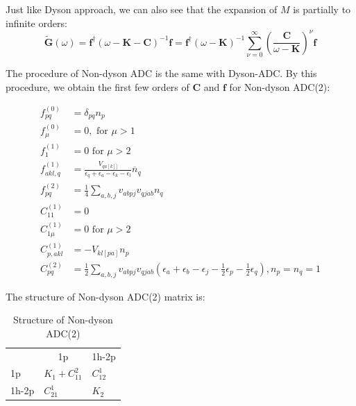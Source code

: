 Just like Dyson approach, we can also see that the expansion of $M$ is partially to infinite orders:
\begin{equation}
	\tilde{\boldsymbol{G}}(\omega)=\boldsymbol{f}^{\dagger}(\omega-\boldsymbol{K}-\boldsymbol{C})^{-1} \boldsymbol{f}=\boldsymbol{f}^{\dagger}(\omega-\boldsymbol{K})^{-1} \sum_{\nu=0}^{\infty}\left(\frac{\boldsymbol{C}}{\omega-\boldsymbol{K}}\right)^{\nu} \boldsymbol{f}
\end{equation}

The procedure of Non-dyson ADC is the same with Dyson-ADC.
By this procedure, we obtain the first few orders of $\boldsymbol{C}$ and $\boldsymbol{f}$ for Non-dyson ADC(2):

\begin{equation}
	\begin{aligned}
		f_{p q}^{(0)}&=\delta_{p q} n_{p}
		\\
		f_{\mu}^{(0)}&=0, \text { for } \mu>1
		\\
		f_{1}^{(1)}&=0 \text { for } \mu>2
		\\
		f_{a k l, q}^{(1)}&=\frac{V_{q a[k] ]}}{\epsilon_{q}+\epsilon_{a}-\epsilon_{k}-\epsilon_{l}} \overline{n}_{q}
		\\
		f_{p q}^{(2)}&=\frac{1}{4} \sum_{a, b, j} v_{a b p j} v_{q j a b} n_{q}
		\\
		C_{11}^{(1)}&=0
		\\
		C_{1 \mu}^{(1)}&=0 \text { for } \mu>2
		\\
		C_{p, a k l}^{(1)}&=-V_{k l[p a]} n_{p}
		\\
		C_{p q}^{(2)}&=\frac{1}{2} \sum_{a, b, j} v_{a b p j} v_{q j a b}\left(\epsilon_{a}+\epsilon_{b}-\epsilon_{j}-\frac{1}{2} \epsilon_{p}-\frac{1}{2} \epsilon_{q}\right), n_{p}=n_{q}=1
	\end{aligned}
\end{equation}

The structure of Non-dyson ADC(2) matrix is:
\begin{table}
	\centering
	\caption{Structure of Non-dyson ADC(2)}
	\label{ADC2}
	\begin{tabular}{ccc}
						       &             1p                      &             1h-2p               \\ \cline{2-3} 
	\multicolumn{1}{l|}{1p   } & \multicolumn{1}{l|}{$K_1+C^2_{11}$} & \multicolumn{1}{l|}{$C^1_{12}$} \\ \cline{2-3} 
	\multicolumn{1}{l|}{1h-2p} & \multicolumn{1}{l|}{$C^1_{21}$}     & \multicolumn{1}{l|}{$K_2$}      \\ \cline{2-3} 
	\end{tabular}
\end{table}

